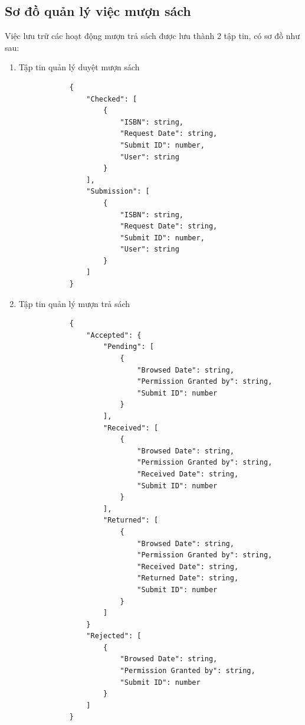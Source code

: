 \documentclass[12pt,a4paper]{report}
\begin{document}
        \subsection{Sơ đồ quản lý việc mượn sách}
        Việc lưu trữ các hoạt động mượn trả sách được lưu thành 2 tập tin, có sơ đồ như sau:
            \begin{enumerate}
                \item Tập tin quản lý duyệt mượn sách
            \begin{verbatim}
            {
                "Checked": [
                    {
                        "ISBN": string,
                        "Request Date": string,
                        "Submit ID": number,
                        "User": string
                    }
                ],
                "Submission": [
                    {
                        "ISBN": string,
                        "Request Date": string,
                        "Submit ID": number,
                        "User": string
                    }
                ]
            }
            \end{verbatim}
                \newpage
                \item Tập tin quản lý mượn trả sách
            \begin{verbatim}
            {
                "Accepted": {
                    "Pending": [
                        {
                            "Browsed Date": string,
                            "Permission Granted by": string,
                            "Submit ID": number
                        }
                    ],
                    "Received": [
                        {
                            "Browsed Date": string,
                            "Permission Granted by": string,
                            "Received Date": string,
                            "Submit ID": number
                        }
                    ],
                    "Returned": [
                        {
                            "Browsed Date": string,
                            "Permission Granted by": string,
                            "Received Date": string,
                            "Returned Date": string,
                            "Submit ID": number
                        }
                    ]
                }
                "Rejected": [
                    {
                        "Browsed Date": string,
                        "Permission Granted by": string,
                        "Submit ID": number
                    }
                ]
            }
            \end{verbatim}
        \end{enumerate}
    \newpage
\end{document}
